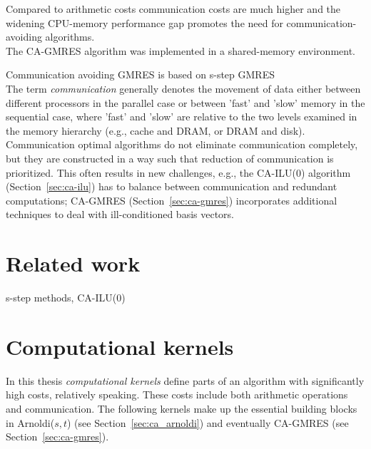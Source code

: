 \documentclass{scrartcl}
\numberwithin{equation}{section}
\begin{document}
Compared to arithmetic costs communication costs are much higher and the widening CPU-memory performance gap promotes the need for communication-avoiding algorithms.\\

The CA-GMRES algorithm was implemented in a shared-memory environment.

Communication avoiding GMRES is based on s-step GMRES 
\cite{Erhel95aparallel}
\\

The term \textit{communication} generally denotes the movement of data either between different processors in the parallel case or between 'fast' and 'slow' memory in the sequential case, where 'fast' and 'slow' are relative to the two levels examined in the memory hierarchy (e.g., cache and DRAM, or DRAM and disk). Communication optimal algorithms do not eliminate communication completely, but they are constructed in a way such that reduction of communication is prioritized. This often results in new challenges, e.g., the  CA-ILU(0) algorithm (Section~\ref{sec:ca-ilu}) has to balance between communication and redundant computations; CA-GMRES (Section~\ref{sec:ca-gmres}) incorporates additional techniques to deal with ill-conditioned basis vectors.

\pagebreak
\section{Related work}
s-step methods, CA-ILU(0)


\section{Computational kernels}
In this thesis \textit{computational kernels} define parts of an algorithm with significantly high costs, relatively speaking. These costs include both arithmetic operations and communication. The following kernels make up the essential building blocks in Arnoldi($s,t$) (see Section~\ref{sec:ca_arnoldi}) and eventually CA-GMRES (see Section~\ref{sec:ca-gmres}).
\end{document}
